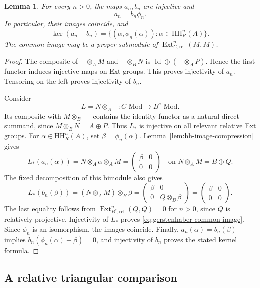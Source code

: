 \documentclass[12pt,a4paper,english,reqno]{amsart}
\numberwithin{equation}{section}
\theoremstyle{plain}
\newtheorem{lemma}[theorem]{Lemma}
\theoremstyle{definition}
\begin{document}
\begin{lemma}
\label{lem:gerstenhaber-common-image}
For every $n>0$, the maps $a_n,b_n$ are injective and
\begin{equation}
 a_n=b_n\phi_n.
 \label{eq:gerstenhaber-common-image}
\end{equation}
In particular, their images coincide, and
\[
 \ker(a_n-b_n)
   =\{(\alpha,\phi_n(\alpha)):
                        \alpha\in\mathrm{HH}^n_R(A)\}.
\]
The common image may be a proper submodule of
$\operatorname{Ext}_{C,\mathrm{rel}}^n(M,M)$.
\end{lemma}

\begin{proof}
The composite of $-\otimes_A M$ and $-\otimes_B N$ is
$\operatorname{Id}\oplus(-\otimes_A P)$.  Hence the first functor induces injective maps on Ext groups.
This proves injectivity of $a_n$.  Tensoring on the left proves
injectivity of $b_n$.

Consider
\[
 L=N\otimes_A-:C\text{-}\mathrm{Mod}
                        \longrightarrow B^e\text{-}\mathrm{Mod}.
\]
Its composite with $M\otimes_B-$ contains the identity functor as
a natural direct summand, since $M\otimes_BN=A\oplus P$.
Thus $L_*$ is injective on all relevant relative Ext groups.
For $\alpha\in\mathrm{HH}^n_R(A)$, set $\beta=\phi_n(\alpha)$.
Lemma~\ref{lem:hh-image-compression} gives
\[
 L_*(a_n(\alpha))
 =N\otimes_A\alpha\otimes_A M
 =\begin{pmatrix}\beta&0\\0&0\end{pmatrix}
 \quad\text{on }N\otimes_AM=B\oplus Q.
\]
The fixed decomposition of this bimodule also gives
\[
 L_*(b_n(\beta))
 =(N\otimes_AM)\otimes_B\beta
 =\begin{pmatrix}\beta&0\\0&Q\otimes_B\beta\end{pmatrix}
 =\begin{pmatrix}\beta&0\\0&0\end{pmatrix}.
\]
The last equality follows from
$\operatorname{Ext}_{B^e,\mathrm{rel}}^n(Q,Q)=0$ for $n>0$,
since $Q$ is relatively projective.
Injectivity of $L_*$ proves \eqref{eq:gerstenhaber-common-image}.
Since $\phi_n$ is an isomorphism, the images coincide.  Finally,
$a_n(\alpha)=b_n(\beta)$ implies
$b_n(\phi_n(\alpha)-\beta)=0$, and injectivity of $b_n$ proves
the stated kernel formula.
\end{proof}

\subsection{A relative triangular comparison}
\label{subsec:relative-triangular-comparison}
\end{document}
